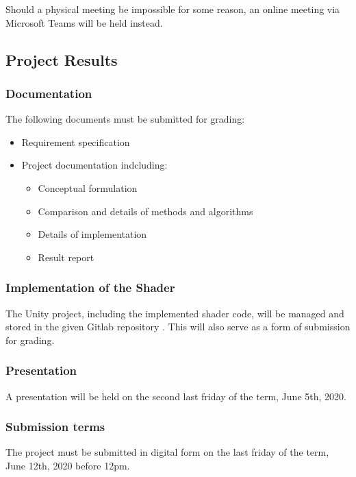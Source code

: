 \vspace{\baselineskip}
\noindent Should a physical meeting be impossible for some reason, an online meeting via Microsoft Teams will be held instead.


\subsection{Project Results}

\subsubsection{Documentation}
The following documents must be submitted for grading:
\begin{itemize}
    \item Requirement specification
    \item Project documentation indcluding:
    \begin{itemize}
        \item Conceptual formulation
        \item Comparison and details of methods and algorithms
        \item Details of implementation
        \item Result report
    \end{itemize}
\end{itemize}

\subsubsection{Implementation of the Shader}
The Unity project, including the implemented shader code, will be managed and stored in the given Gitlab repository \cite{gitlab}. This will also serve as a form of submission for grading.

\subsubsection{Presentation}
A presentation will be held on the second last friday of the term, June 5th, 2020.

\subsubsection{Submission terms}
The project must be submitted in digital form on the last friday of the term, June 12th, 2020 before 12pm.